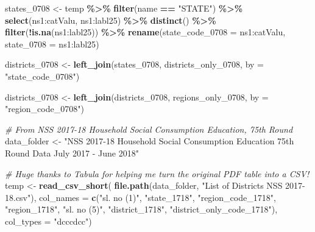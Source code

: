 \documentclass[
]{article}
\newenvironment{Shaded}{\begin{snugshade}}{\end{snugshade}}
\newcommand{\AttributeTok}[1]{\textcolor[rgb]{0.13,0.29,0.53}{#1}}
\newcommand{\CommentTok}[1]{\textcolor[rgb]{0.56,0.35,0.01}{\textit{#1}}}
\newcommand{\FunctionTok}[1]{\textcolor[rgb]{0.13,0.29,0.53}{\textbf{#1}}}
\newcommand{\NormalTok}[1]{#1}
\newcommand{\OtherTok}[1]{\textcolor[rgb]{0.56,0.35,0.01}{#1}}
\newcommand{\SpecialCharTok}[1]{\textcolor[rgb]{0.81,0.36,0.00}{\textbf{#1}}}
\newcommand{\StringTok}[1]{\textcolor[rgb]{0.31,0.60,0.02}{#1}}
\begin{document}
\begin{Shaded}
\begin{Highlighting}[]
\NormalTok{states\_0708 }\OtherTok{\textless{}{-}}\NormalTok{ temp }\SpecialCharTok{\%\textgreater{}\%} 
  \FunctionTok{filter}\NormalTok{(name }\SpecialCharTok{==} \StringTok{"STATE"}\NormalTok{) }\SpecialCharTok{\%\textgreater{}\%} 
  \FunctionTok{select}\NormalTok{(}\StringTok{\textasciigrave{}}\AttributeTok{ns1:catValu}\StringTok{\textasciigrave{}}\NormalTok{, }\StringTok{\textasciigrave{}}\AttributeTok{ns1:labl25}\StringTok{\textasciigrave{}}\NormalTok{) }\SpecialCharTok{\%\textgreater{}\%} 
  \FunctionTok{distinct}\NormalTok{() }\SpecialCharTok{\%\textgreater{}\%} 
  \FunctionTok{filter}\NormalTok{(}\SpecialCharTok{!}\FunctionTok{is.na}\NormalTok{(}\StringTok{\textasciigrave{}}\AttributeTok{ns1:labl25}\StringTok{\textasciigrave{}}\NormalTok{)) }\SpecialCharTok{\%\textgreater{}\%} 
  \FunctionTok{rename}\NormalTok{(}\AttributeTok{state\_code\_0708 =} \StringTok{\textasciigrave{}}\AttributeTok{ns1:catValu}\StringTok{\textasciigrave{}}\NormalTok{, }\AttributeTok{state\_0708 =} \StringTok{\textasciigrave{}}\AttributeTok{ns1:labl25}\StringTok{\textasciigrave{}}\NormalTok{)}

\NormalTok{districts\_0708 }\OtherTok{\textless{}{-}} \FunctionTok{left\_join}\NormalTok{(states\_0708, districts\_only\_0708, }\AttributeTok{by =} \StringTok{"state\_code\_0708"}\NormalTok{)}

\NormalTok{districts\_0708 }\OtherTok{\textless{}{-}} \FunctionTok{left\_join}\NormalTok{(districts\_0708, regions\_only\_0708, }\AttributeTok{by =} \StringTok{"region\_code\_0708"}\NormalTok{)}





\CommentTok{\# From NSS 2017{-}18 Household Social Consumption Education, 75th Round}
\NormalTok{data\_folder }\OtherTok{\textless{}{-}} \StringTok{"NSS 2017{-}18 Household Social Consumption Education 75th Round Data July 2017 {-} June 2018"}

\CommentTok{\# Huge thanks to Tabula for helping me turn the original PDF table into a CSV!}
\NormalTok{temp }\OtherTok{\textless{}{-}} \FunctionTok{read\_csv\_short}\NormalTok{(}
  \FunctionTok{file.path}\NormalTok{(data\_folder, }\StringTok{"List of Districts NSS 2017{-}18.csv"}\NormalTok{),}
  \AttributeTok{col\_names =} \FunctionTok{c}\NormalTok{(}\StringTok{"sl. no (1)"}\NormalTok{, }\StringTok{"state\_1718"}\NormalTok{, }\StringTok{"region\_code\_1718"}\NormalTok{, }\StringTok{"region\_1718"}\NormalTok{, }\StringTok{"sl. no (5)"}\NormalTok{, }\StringTok{"district\_1718"}\NormalTok{, }\StringTok{"district\_only\_code\_1718"}\NormalTok{),}
  \AttributeTok{col\_types =} \StringTok{"dcccdcc"}\NormalTok{)}


\end{Highlighting}
\end{Shaded}
\end{document}
